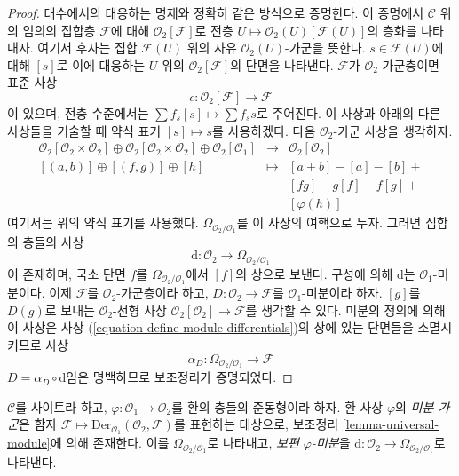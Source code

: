 \begin{proof}
대수에서의 대응하는 명제와 정확히 같은 방식으로 증명한다. 이 증명에서
$\mathcal{C}$ 위의 임의의 집합층 $\mathcal{F}$에 대해
$\mathcal{O}_2[\mathcal{F}]$로 전층
$U \mapsto \mathcal{O}_2(U)[\mathcal{F}(U)]$의 층화를 나타내자. 여기서 후자는
집합 $\mathcal{F}(U)$ 위의 자유 $\mathcal{O}_2(U)$-가군을 뜻한다.
$s \in \mathcal{F}(U)$에 대해 $[s]$로 이에 대응하는 $U$ 위의
$\mathcal{O}_2[\mathcal{F}]$의 단면을 나타낸다. $\mathcal{F}$가
$\mathcal{O}_2$-가군층이면 표준 사상
$$
c : \mathcal{O}_2[\mathcal{F}] \longrightarrow \mathcal{F}
$$
이 있으며, 전층 수준에서는 $\sum f_s[s] \mapsto \sum f_s s$로 주어진다.
이 사상과 아래의 다른 사상들을 기술할 때 약식 표기 $[s] \mapsto s$를
사용하겠다. 다음 $\mathcal{O}_2$-가군 사상을 생각하자.
\begin{equation}
\label{equation-define-module-differentials}
\begin{matrix}
\mathcal{O}_2[\mathcal{O}_2 \times \mathcal{O}_2] \oplus
\mathcal{O}_2[\mathcal{O}_2 \times \mathcal{O}_2] \oplus
\mathcal{O}_2[\mathcal{O}_1] &
\longrightarrow &
\mathcal{O}_2[\mathcal{O}_2] \\
[(a, b)] \oplus [(f, g)] \oplus [h] & \longmapsto & [a + b] - [a] - [b] + \\
& & [fg] - g[f] - f[g] + \\
& & [\varphi(h)]
\end{matrix}
\end{equation}
여기서는 위의 약식 표기를 사용했다. $\Omega_{\mathcal{O}_2/\mathcal{O}_1}$를
이 사상의 여핵으로 두자. 그러면 집합의 층들의 사상
$$
\text{d} : \mathcal{O}_2 \longrightarrow \Omega_{\mathcal{O}_2/\mathcal{O}_1}
$$
이 존재하며, 국소 단면 $f$를 $\Omega_{\mathcal{O}_2/\mathcal{O}_1}$에서
$[f]$의 상으로 보낸다. 구성에 의해 $\text{d}$는 $\mathcal{O}_1$-미분이다.
이제 $\mathcal{F}$를 $\mathcal{O}_2$-가군층이라 하고,
$D : \mathcal{O}_2 \to \mathcal{F}$를 $\mathcal{O}_1$-미분이라 하자.
$[g]$를 $D(g)$로 보내는 $\mathcal{O}_2$-선형 사상
$\mathcal{O}_2[\mathcal{O}_2] \to \mathcal{F}$를 생각할 수 있다. 미분의
정의에 의해 이 사상은 사상 (\ref{equation-define-module-differentials})의
상에 있는 단면들을 소멸시키므로 사상
$$
\alpha_D : \Omega_{\mathcal{O}_2/\mathcal{O}_1} \longrightarrow \mathcal{F}
$$
$D = \alpha_D \circ \text{d}$임은 명백하므로 보조정리가 증명되었다.
\end{proof}

\begin{definition}
\label{definition-module-differentials}
$\mathcal{C}$를 사이트라 하고, $\varphi : \mathcal{O}_1 \to \mathcal{O}_2$를
환의 층들의 준동형이라 하자. 환 사상 $\varphi$의 {\it 미분 가군}은 함자
$\mathcal{F} \mapsto \text{Der}_{\mathcal{O}_1}(\mathcal{O}_2, \mathcal{F})$를
표현하는 대상으로, 보조정리 \ref{lemma-universal-module}에 의해 존재한다.
이를 $\Omega_{\mathcal{O}_2/\mathcal{O}_1}$로 나타내고, {\it 보편
$\varphi$-미분}을
$\text{d} : \mathcal{O}_2 \to \Omega_{\mathcal{O}_2/\mathcal{O}_1}$로 나타낸다.
\end{definition}


